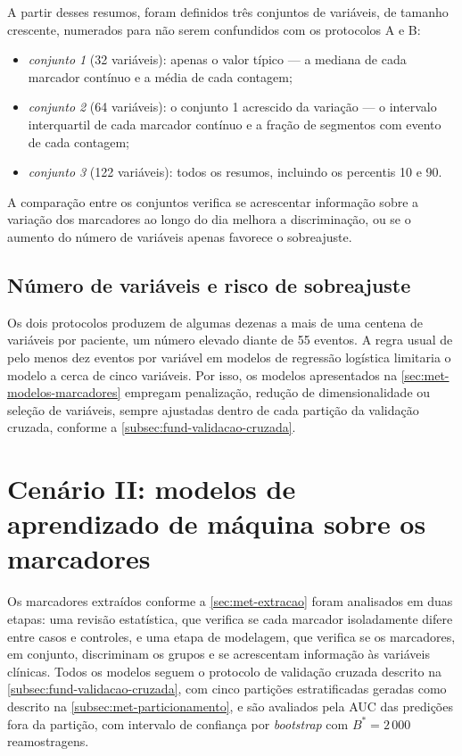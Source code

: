 A partir desses resumos, foram definidos três conjuntos de variáveis, de
tamanho crescente, numerados para não serem confundidos com os protocolos
A e B:

\begin{itemize}
	\item \textit{conjunto 1} (32 variáveis): apenas o valor típico --- a
	mediana de cada marcador contínuo e a média de cada contagem;
	\item \textit{conjunto 2} (64 variáveis): o conjunto 1 acrescido da
	variação --- o intervalo interquartil de cada marcador contínuo e a
	fração de segmentos com evento de cada contagem;
	\item \textit{conjunto 3} (122 variáveis): todos os resumos, incluindo
	os percentis 10 e 90.
\end{itemize}

\noindent
A comparação entre os conjuntos verifica se acrescentar informação sobre a
variação dos marcadores ao longo do dia melhora a discriminação, ou se o
aumento do número de variáveis apenas favorece o sobreajuste.

\subsection{Número de variáveis e risco de sobreajuste}
\label{subsec:met-numero-variaveis}

Os dois protocolos produzem de algumas dezenas a mais de uma centena de
variáveis por paciente, um número elevado diante de 55 eventos. A regra
usual de pelo menos dez eventos por variável em modelos de regressão
logística \cite{peduzzi1996simulation} limitaria o modelo a cerca de cinco
variáveis. Por isso, os modelos apresentados na
\autoref{sec:met-modelos-marcadores} empregam penalização, redução de
dimensionalidade ou seleção de variáveis, sempre ajustadas dentro de cada
partição da validação cruzada, conforme a
\autoref{subsec:fund-validacao-cruzada}.


\section{Cenário II: modelos de aprendizado de máquina sobre os marcadores}
\label{sec:met-modelos-marcadores}

Os marcadores extraídos conforme a \autoref{sec:met-extracao} foram
analisados em duas etapas: uma revisão estatística, que verifica se cada
marcador isoladamente difere entre casos e controles, e uma etapa de
modelagem, que verifica se os marcadores, em conjunto, discriminam os
grupos e se acrescentam informação às variáveis clínicas. Todos os modelos
seguem o protocolo de validação cruzada descrito na
\autoref{subsec:fund-validacao-cruzada}, com cinco partições
estratificadas geradas como descrito na \autoref{subsec:met-particionamento},
e são avaliados pela \gls{AUC} das
predições fora da partição, com intervalo de confiança por
\textit{bootstrap} com $B^{*} = 2\,000$ reamostragens.

